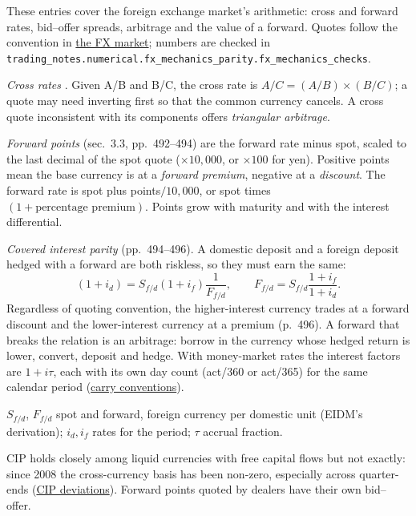 These entries cover the foreign exchange market's arithmetic: cross and forward rates, bid--offer spreads, arbitrage and the value of a forward. Quotes follow the convention in \hyperref[def:fx-market-real-exchange-rates]{the FX market}; numbers are checked in \nolinkurl{trading_notes.numerical.fx_mechanics_parity.fx_mechanics_checks}.

\begin{qfmethod}\label{meth:cross-forward-rates}
 \emph{Cross rates} \citep[chap.~9, sec.~3.2, pp.~488--492]{economics-investment-decision-makers-2013}. Given A/B and B/C, the cross rate is $A/C=(A/B)\times(B/C)$; a quote may need inverting first so that the common currency cancels. A cross quote inconsistent with its components offers \emph{triangular arbitrage}.

\emph{Forward points} (sec.~3.3, pp.~492--494) are the forward rate minus spot, scaled to the last decimal of the spot quote ($\times10{,}000$, or $\times100$ for yen). Positive points mean the base currency is at a \emph{forward premium}, negative at a \emph{discount}. The forward rate is spot plus points$/10{,}000$, or spot times $(1+\text{percentage premium})$. Points grow with maturity and with the interest differential.

\emph{Covered interest parity} (pp.~494--496). A domestic deposit and a foreign deposit hedged with a forward are both riskless, so they must earn the same:
\[
(1+i_d)=S_{f/d}(1+i_f)\frac{1}{F_{f/d}},\qquad F_{f/d}=S_{f/d}\frac{1+i_f}{1+i_d}.
\]
Regardless of quoting convention, the higher-interest currency trades at a forward discount and the lower-interest currency at a premium (p.~496). A forward that breaks the relation is an arbitrage: borrow in the currency whose hedged return is lower, convert, deposit and hedge. With money-market rates the interest factors are $1+i\tau$, each with its own day count (act/360 or act/365) for the same calendar period (\hyperref[mod:fx-carry-trade]{carry conventions}).

 $S_{f/d}$, $F_{f/d}$ spot and forward, foreign currency per domestic unit (EIDM's derivation); $i_d,i_f$ rates for the period; $\tau$ accrual fraction.

 CIP holds closely among liquid currencies with free capital flows but not exactly: since 2008 the cross-currency basis has been non-zero, especially across quarter-ends (\hyperref[ev:cip-deviations]{CIP deviations}). Forward points quoted by dealers have their own bid--offer.


\end{qfmethod}
